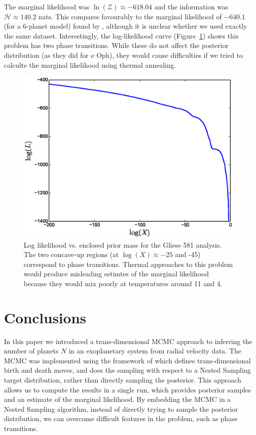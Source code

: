 \documentclass[useAMS,usenatbib]{mn2e}
\begin{document}
The marginal likelihood was $\ln(\mathcal{Z}) \approx -618.04$ and the
information was $\mathcal{H} \approx 140.2$ nats. This compares favourably
to the marginal likelihood of $-640.1$ (for a 6-planet model)
found by \citet{fengji}, although it is unclear whether we used exactly the
same dataset.
Interestingly, the log-likelihood curve (Figure~\ref{fig:logl})
shows this problem has two phase transitions. While these do not affect the
posterior distribution (as they did for $\nu$ Oph), they would cause difficulties
if we tried to calculte the marginal likelihood using thermal annealing.

\begin{figure}
\includegraphics[scale=0.45]{Figures/logl.eps}
\caption{Log likelihood vs. enclosed prior mass for the Gliese 581 analysis.
The two concave-up regions (at $\log(X) \approx -25$ and -45) correspond to
phase transitions. Thermal approaches to this problem would produce misleading
estimtes of the marginal likelihood because they would mix poorly at temperatures
around 11 and 4.
\label{fig:logl}}
\end{figure}


\section{Conclusions}
In this paper we introduced a trans-dimensional MCMC approach to inferring
the number of planets $N$ in an exoplanetary system from radial velocity data.
The MCMC was implemented using the framework of \citet{rjobject} which
defines trans-dimensional birth and death moves, and does the sampling
with respect to a Nested Sampling target distribution, rather than directly
sampling the posterior. This approach allows us to compute the results in a
single run, which provides posterior samples and an estimate of the marginal
likelihood. By embedding the MCMC in a Nested Sampling algorithm, instead of
directly trying to sample the posterior distribution, we can overcome difficult
features in the problem, such as phase transitions.
\end{document}
